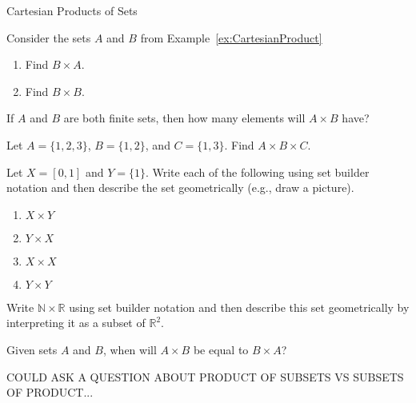 \begin{section}{Cartesian Products of Sets}
\begin{problem}
Consider the sets $A$ and $B$ from Example~\ref{ex:CartesianProduct}
\begin{enumerate}[label=\textrm{(\alph*)}]
\item Find $B\times A$. 
\item Find $B\times B$.
\end{enumerate}
\end{problem}

\begin{problem}
If $A$ and $B$ are both finite sets, then how many elements will $A\times B$ have?
\end{problem}

\begin{problem} 
Let $A=\{1, 2, 3\}$, $B=\{1,2\}$, and $C=\{1,3\}$. Find $A \times B\times C$. 
\end{problem}

\begin{problem}
Let $X=[0,1]$ and $Y=\{1\}$.  Write each of the following using set builder notation and then describe the set geometrically (e.g., draw a picture). 
\begin{enumerate}[label=\textrm{(\alph*)}]
\item $X\times Y$
\item $Y\times X$
\item $X\times X$
\item $Y\times Y$
\end{enumerate}
\end{problem}

\begin{problem}\label{prob:some lines}
Write $\mathbb{N}\times \mathbb{R}$ using set builder notation and then describe this set geometrically by interpreting it as a subset of $\mathbb{R}^2$.
\end{problem}

\begin{problem}
Given sets $A$ and $B$, when will $A\times B$ be equal to $B\times A$?
\end{problem}

COULD ASK A QUESTION ABOUT PRODUCT OF SUBSETS VS SUBSETS OF PRODUCT...

\end{section}